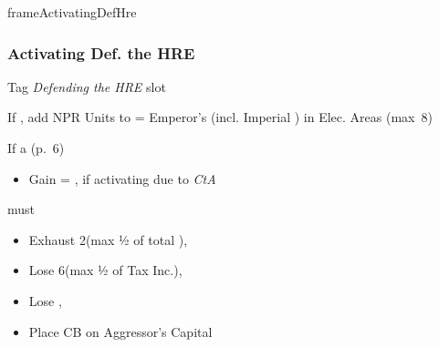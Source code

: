 \documentclass[10pt]{article}
\newlength{\fhActivatingDefHre} \setlength\fhActivatingDefHre{14\baselineskip}
\begin{document}
\begin{dynamiccontents*}{frameActivatingDefHre}\begin{eubox}{\fhActivatingDefHre}
	\subsubsection*{Activating Def. the HRE }
	\begin{itemize}
		\item Tag \emph{Defending the HRE} slot
		\item If , add NPR Units to  \manpower = Emperor's \influence (incl. Imperial \influence) in Elec. Areas (max~8)
		{\botrules
		\item If a  (p.~6)
		\begin{itemize}
			\item Gain \botpower = \authority, if activating due to \emph{CtA}
		\end{itemize}
		}
		\item {} must
		\begin{itemize}
			\item Exhaust 2\manpower (max ½ of total \manpower), 
			\item Lose 6\ducats (max ½ of Tax Inc.), 
			\item Lose , 
			\item Place CB on Aggressor's Capital
		\end{itemize}
		\item {}
	\end{itemize}
\end{eubox}\end{dynamiccontents*}
\end{document}

